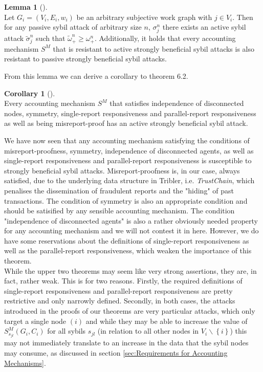 \documentclass[11pt,a4paper]{article}
\theoremstyle{definition}
\theoremstyle{theorem}
\theoremstyle{proposition}
\theoremstyle{corollary}
\newtheorem{corollary}{Corollary}[section]
\theoremstyle{lemma}
\newtheorem{lemma}{Lemma}[section]
\theoremstyle{example}
\theoremstyle{remark}
\begin{document}
\begin{lemma}[]\ \\
Let $G_i=(V_i,E_i,w_i)$ be an arbitrary subjective work graph with $j\in{}V_i$. Then for any passive sybil attack of arbitrary size $n$, $\sigma_j^n$ there exists an active sybil attack $\tilde{\sigma}_j^n$ such that $\tilde{\omega}_{+}^n \geq \omega_{+}^n$. Additionally, it holds that every accounting mechanism $S^M$ that is resistant to active strongly beneficial sybil attacks is also resistant to passive strongly beneficial sybil attacks. 
\end{lemma}

\noindent{}From this lemma we can derive a corollary to theorem 6.2. \vspace{1em}\\

\begin{corollary}[]\ \\
Every accounting mechanism $S^M$ that satisfies independence of disconnected nodes, symmetry, single-report responsiveness and parallel-report responsiveness as well as being misreport-proof has an active strongly beneficial sybil attack. 
\end{corollary}

\noindent{}We have now seen that any accounting mechanism satisfying the conditions of misreport-proofness, symmetry, independence of disconnected agents, as well as single-report responsiveness and parallel-report responsiveness is susceptible to strongly beneficial sybil attacks. Misreport-proofness is, in our case, always satisfied, due to the underlying data structure in Tribler, i.e. {\it TrustChain}, which penalises the dissemination of fraudulent reports and the "hiding" of past transactions. The condition of symmetry is also an appropriate condition and should be satisified by any sensible accounting mechanism. The condition "independence of disconnected agents" is also a rather obviously needed property for any accounting mechanism and we will not contest it in here. However, we do have some reservations about the definitions of single-report responsiveness as well as the parallel-report responsiveness, which weaken the importance of this theorem. \vspace{1em}\\

\noindent{}While the upper two theorems may seem like very strong assertions, they are, in fact, rather weak. This is for two reasons. Firstly, the required definitions of single-report responsiveness and parallel-report responsiveness are pretty restrictive and only narrowly defined. Secondly, in both cases, the attacks introduced in the proofs of our theorems are very particular attacks, which only target a single node $(i)$ and while they may be able to increase the value of $S^M_{s_{jl}}(G_i,C_i)$ for all sybils $s_{jl}$ (in relation to all other nodes in $V_i\backslash{}\left\lbrace{}i\right\rbrace$) this may not immediately translate to an increase in the data that the sybil nodes may consume, as discussed in section \ref{sec:Requirements for Accounting Mechanisms}.\vspace{1em}\\
\end{document}
